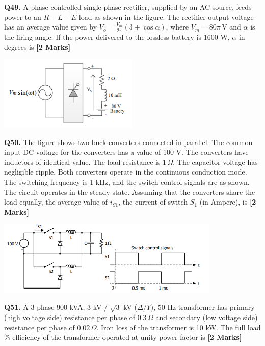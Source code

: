 \documentclass[11pt]{article}
\newcommand{\questionb}[2]{
    \noindent\textbf{Q#2.} #1 \hfill \textbf{[2 Marks]}
}
\begin{document}
\questionb{A phase controlled single phase rectifier, supplied by an AC source, feeds power to an \( R-L-E \) load as shown in the figure. The rectifier output voltage has an average value given by \( V_o = \frac{V_m}{2\pi}(3 + \cos \alpha) \), where \( V_m = 80\pi \, \text{V} \) and \( \alpha \) is the firing angle. If the power delivered to the lossless battery is 1600 W, \( \alpha \) in degrees is}{49}
\begin{center}
\includegraphics[width=0.5\textwidth]{figures/49.png}
\end{center}
\vspace{0.5cm}

\questionb{The figure shows two buck converters connected in parallel. The common input DC voltage for the converters has a value of 100 V. The converters have inductors of identical value. The load resistance is \( 1 \, \Omega \). The capacitor voltage has negligible ripple. Both converters operate in the continuous conduction mode. The switching frequency is 1 kHz, and the switch control signals are as shown. The circuit operates in the steady state. Assuming that the converters share the load equally, the average value of \( i_{S1} \), the current of switch \( S_1 \) (in Ampere), is}{50}
\begin{center}
\includegraphics[width=0.8\textwidth]{figures/50.png}
\end{center}
\vspace{0.5cm}

\questionb{A 3-phase 900 kVA, 3 kV / \( \sqrt{3} \) kV (\( \Delta / Y \)), 50 Hz transformer has primary (high voltage side) resistance per phase of \( 0.3\, \Omega \) and secondary (low voltage side) resistance per phase of \( 0.02\, \Omega \). Iron loss of the transformer is 10 kW. The full load \% efficiency of the transformer operated at unity power factor is}{51}
\vspace{0.5cm}
\end{document}
